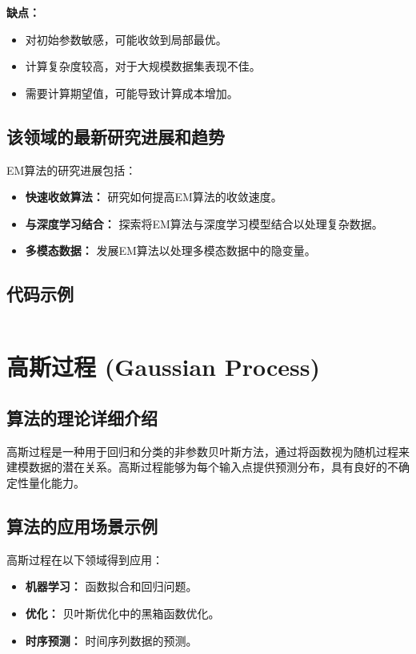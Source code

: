 \textbf{缺点：}
\begin{itemize}
    \item 对初始参数敏感，可能收敛到局部最优。
    \item 计算复杂度较高，对于大规模数据集表现不佳。
    \item 需要计算期望值，可能导致计算成本增加。
\end{itemize}

\subsection*{该领域的最新研究进展和趋势}
EM算法的研究进展包括：
\begin{itemize}
    \item \textbf{快速收敛算法：} 研究如何提高EM算法的收敛速度。
    \item \textbf{与深度学习结合：} 探索将EM算法与深度学习模型结合以处理复杂数据。
    \item \textbf{多模态数据：} 发展EM算法以处理多模态数据中的隐变量。
\end{itemize}
\subsection*{代码示例}
\begin{lstlisting}

\end{lstlisting}


\section{高斯过程 (Gaussian Process)}
\subsection*{算法的理论详细介绍}
高斯过程是一种用于回归和分类的非参数贝叶斯方法，通过将函数视为随机过程来建模数据的潜在关系。高斯过程能够为每个输入点提供预测分布，具有良好的不确定性量化能力。

\subsection*{算法的应用场景示例}
高斯过程在以下领域得到应用：
\begin{itemize}
    \item \textbf{机器学习：} 函数拟合和回归问题。
    \item \textbf{优化：} 贝叶斯优化中的黑箱函数优化。
    \item \textbf{时序预测：} 时间序列数据的预测。
\end{itemize}


